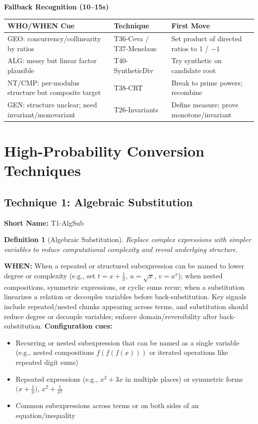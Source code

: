 \documentclass[12pt]{article}
\newtheorem{definition}{Definition}[section]
\begin{document}
\begin{tcolorbox}[colback=blue!5!white,colframe=blue!75!black,title={Use this as a speed index; confirm WHEN conditions before executing}]
\vspace{2mm}
\textbf{Fallback Recognition (10--15s)}
\begin{tabularx}{\textwidth}{|p{}|p{}|X|}
\hline
\textbf{WHO/WHEN Cue} & \textbf{Technique} & \textbf{First Move} \\
\hline
GEO: concurrency/collinearity by ratios & T36-Ceva / T37-Menelaus & Set product of directed ratios to $1$ / $-1$ \\
\hline
ALG: messy but linear factor plausible & T40-SyntheticDiv & Try synthetic on candidate root \\
\hline
NT/CMP: per-modulus structure but composite target & T38-CRT & Break to prime powers; recombine \\
\hline
GEN: structure unclear; need invariant/monovariant & T26-Invariants & Define measure; prove monotone/invariant \\
\hline
\end{tabularx}
\end{tcolorbox}

\section{High-Probability Conversion Techniques}

\subsection{Technique 1: Algebraic Substitution}
\textbf{Short Name:} T1-AlgSub

\begin{definition}[Algebraic Substitution]
Replace complex expressions with simpler variables to reduce computational complexity and reveal underlying structure.
\end{definition}

\textbf{WHEN:} When a repeated or structured subexpression can be named to lower degree or complexity (e.g., set \(t = x + \tfrac{1}{x}\), \(u = \sqrt{x}\), \(v = a^x\)); when nested compositions, symmetric expressions, or cyclic sums recur; when a substitution linearizes a relation or decouples variables before back-substitution. Key signals include repeated/nested chunks appearing across terms, and substitution should reduce degree or decouple variables; enforce domain/reversibility after back-substitution.
\textbf{Configuration cues:}
\begin{itemize}
    \item Recurring or nested subexpression that can be named as a single variable (e.g., nested compositions $f(f(f(x)))$ or iterated operations like repeated digit sums)
    \item Repeated expressions (e.g., $x^2 + 3x$ in multiple places) or symmetric forms $\bigl(x+\tfrac{1}{x}\bigr)$, $x^2+\tfrac{1}{x^2}$
    \item Common subexpressions across terms or on both sides of an equation/inequality
\end{itemize}
\end{document}
